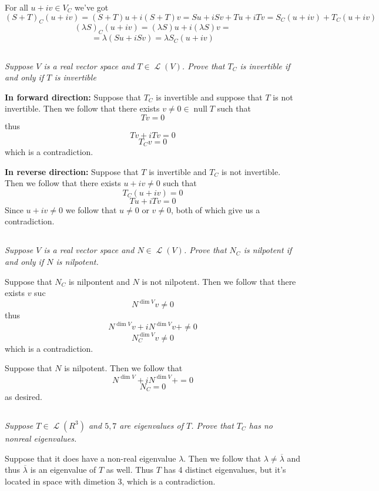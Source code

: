 \documentclass[11pt,oneside,titlepage]{book}
\DeclareMathOperator \map {\mathcal {L}}
\DeclareMathOperator \ns {null}
\begin{document}
For all $u + iv \in V_C$ we've got 
$$(S + T)_C(u + iv) = (S + T)u + i(S + T)v = Su + iSv + Tu + iTv = S_C(u + iv) + T_C(u + iv)$$
$$(\lambda S)_C(u + iv) = (\lambda S) u + i (\lambda S) v = $$
$$
= \lambda (S u + iSv) = \lambda S_C(u + iv)$$

\subsection{}

\textit{Suppose $V$ is a real vector space and $T \in \map(V)$. Prove that $T_C$ is
  invertible if and only if $T$ is invertible}

\textbf{In forward direction: }
Suppose that $T_C$ is invertible and suppose that $T$ is not invertible. Then we follow that
there exists $v \neq 0 \in \ns T$ such that
$$Tv = 0$$
thus
$$Tv + iTv = 0$$
$$T_Cv = 0$$
which is a contradiction.

\textbf{In reverse direction: }
Suppose that $T$ is invertible and $T_C$  is not invertible. Then we follow that there exists
$u + iv \neq 0$ such that
$$T_C(u + iv) = 0$$
$$Tu + iTv = 0$$
Since $u + iv \neq 0$ we follow that $u \neq 0$ or $v \neq 0$, both of which
give us a contradiction.

\subsection{}

\textit{Suppose $V$ is a real vector space and $N \in \map(V)$. Prove that $N_C$ is
  nilpotent if and only if $N$ is nilpotent.}

Suppose that $N_C$ is nilpontent and $N$ is not nilpotent. Then we follow that
there exists $v$ suc
$$N^{\dim V}v \neq 0$$
thus 
$$N^{\dim V}v +  iN^{\dim V}v + \neq 0$$
$$N_C^{\dim V}v \neq 0$$
which is a contradiction.

Suppose that $N$ is nilpotent. Then we follow that
$$N^{\dim V} +  iN^{\dim V} + = 0$$
$$N_C = 0$$
as desired.

\subsection{}

\textit{Suppose $T \in \map(R^3)$ and $5, 7$ are eigenvalues of $T$. Prove that $T_C$ has
  no nonreal eigenvalues.}

Suppose that it does have a non-real eigenvalue $\lambda$. Then we follow that
$\lambda \neq \overline{\lambda}$ and thus $\overline{\lambda}$ is an
eigenvalue of $T$ as well. Thus $T$ has 4 distinct eigenvalues, but it's located
in space with dimetion 3, which is a contradiction.
\end{document}
